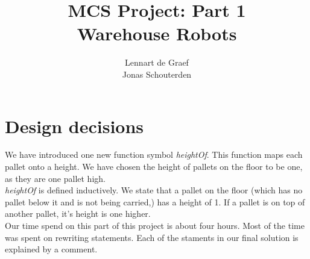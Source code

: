 \documentclass[10pt,a4paper]{article}
\begin{document}
\author{Lennart de Graef\\Jonas Schouterden}
\title{MCS Project: Part 1 \\
Warehouse Robots}
\maketitle

\section*{Design decisions}
We have introduced one new function symbol \emph{heightOf}. This function maps each pallet onto a height. We have chosen the height of pallets on the floor to be one, as they are one pallet high.
\\
\emph{heightOf} is defined inductively. We state that a pallet on the floor (which has no pallet below it and is not being carried,) has a height of 1.
If a pallet is on top of another pallet, it's height is one higher.\\
Our time spend on this part of this project is about four hours. Most of the time was spent on rewriting statements. Each of the staments in our final solution is explained by a comment. 
\end{document}
